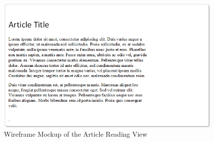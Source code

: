 \begin{figure}
	\caption{Wireframe Mockup of the Article Reading View}
	\label{fig:view3}
	\includegraphics[width=\textwidth]{Graphics/View3}
\end{figure}